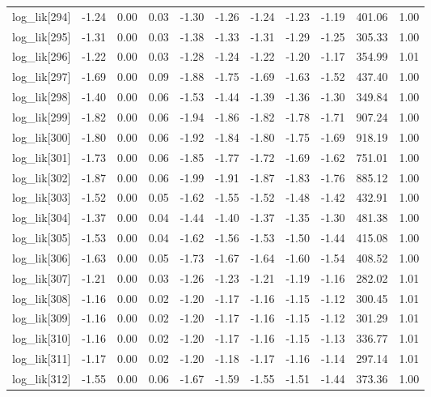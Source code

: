 \begin{table}[ht]
\begin{tabular}{rrrrrrrrrrr}
  log\_lik[294] & -1.24 & 0.00 & 0.03 & -1.30 & -1.26 & -1.24 & -1.23 & -1.19 & 401.06 & 1.00 \\ 
  log\_lik[295] & -1.31 & 0.00 & 0.03 & -1.38 & -1.33 & -1.31 & -1.29 & -1.25 & 305.33 & 1.00 \\ 
  log\_lik[296] & -1.22 & 0.00 & 0.03 & -1.28 & -1.24 & -1.22 & -1.20 & -1.17 & 354.99 & 1.01 \\ 
  log\_lik[297] & -1.69 & 0.00 & 0.09 & -1.88 & -1.75 & -1.69 & -1.63 & -1.52 & 437.40 & 1.00 \\ 
  log\_lik[298] & -1.40 & 0.00 & 0.06 & -1.53 & -1.44 & -1.39 & -1.36 & -1.30 & 349.84 & 1.00 \\ 
  log\_lik[299] & -1.82 & 0.00 & 0.06 & -1.94 & -1.86 & -1.82 & -1.78 & -1.71 & 907.24 & 1.00 \\ 
  log\_lik[300] & -1.80 & 0.00 & 0.06 & -1.92 & -1.84 & -1.80 & -1.75 & -1.69 & 918.19 & 1.00 \\ 
  log\_lik[301] & -1.73 & 0.00 & 0.06 & -1.85 & -1.77 & -1.72 & -1.69 & -1.62 & 751.01 & 1.00 \\ 
  log\_lik[302] & -1.87 & 0.00 & 0.06 & -1.99 & -1.91 & -1.87 & -1.83 & -1.76 & 885.12 & 1.00 \\ 
  log\_lik[303] & -1.52 & 0.00 & 0.05 & -1.62 & -1.55 & -1.52 & -1.48 & -1.42 & 432.91 & 1.00 \\ 
  log\_lik[304] & -1.37 & 0.00 & 0.04 & -1.44 & -1.40 & -1.37 & -1.35 & -1.30 & 481.38 & 1.00 \\ 
  log\_lik[305] & -1.53 & 0.00 & 0.04 & -1.62 & -1.56 & -1.53 & -1.50 & -1.44 & 415.08 & 1.00 \\ 
  log\_lik[306] & -1.63 & 0.00 & 0.05 & -1.73 & -1.67 & -1.64 & -1.60 & -1.54 & 408.52 & 1.00 \\ 
  log\_lik[307] & -1.21 & 0.00 & 0.03 & -1.26 & -1.23 & -1.21 & -1.19 & -1.16 & 282.02 & 1.01 \\ 
  log\_lik[308] & -1.16 & 0.00 & 0.02 & -1.20 & -1.17 & -1.16 & -1.15 & -1.12 & 300.45 & 1.01 \\ 
  log\_lik[309] & -1.16 & 0.00 & 0.02 & -1.20 & -1.17 & -1.16 & -1.15 & -1.12 & 301.29 & 1.01 \\ 
  log\_lik[310] & -1.16 & 0.00 & 0.02 & -1.20 & -1.17 & -1.16 & -1.15 & -1.13 & 336.77 & 1.01 \\ 
  log\_lik[311] & -1.17 & 0.00 & 0.02 & -1.20 & -1.18 & -1.17 & -1.16 & -1.14 & 297.14 & 1.01 \\ 
  log\_lik[312] & -1.55 & 0.00 & 0.06 & -1.67 & -1.59 & -1.55 & -1.51 & -1.44 & 373.36 & 1.00 \\ 

\end{tabular}
\end{table}
